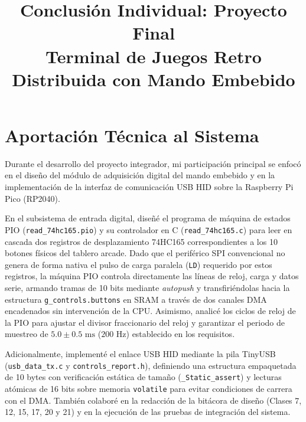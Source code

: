 \documentclass[conference]{IEEEtran}
\begin{document}
\title{Conclusión Individual: Proyecto Final \\
\large Terminal de Juegos Retro Distribuida con Mando Embebido}

\author{
}

\maketitle

\section*{Aportación Técnica al Sistema}

Durante el desarrollo del proyecto integrador, mi participación principal se enfocó en el diseño del módulo de adquisición digital del mando embebido y en la implementación de la interfaz de comunicación USB HID sobre la Raspberry Pi Pico (RP2040).

En el subsistema de entrada digital, diseñé el programa de máquina de estados PIO (\texttt{read\_74hc165.pio}) y su controlador en C (\texttt{read\_74hc165.c}) para leer en cascada dos registros de desplazamiento 74HC165 correspondientes a los 10 botones físicos del tablero arcade. Dado que el periférico SPI convencional no genera de forma nativa el pulso de carga paralela (\texttt{LD}) requerido por estos registros, la máquina PIO controla directamente las líneas de reloj, carga y datos serie, armando tramas de 10 bits mediante \textit{autopush} y transfiriéndolas hacia la estructura \texttt{g\_controls.buttons} en SRAM a través de dos canales DMA encadenados sin intervención de la CPU. Asimismo, analicé los ciclos de reloj de la PIO para ajustar el divisor fraccionario del reloj y garantizar el periodo de muestreo de $5.0 \pm 0.5\text{ ms}$ ($200\text{ Hz}$) establecido en los requisitos.

Adicionalmente, implementé el enlace USB HID mediante la pila TinyUSB (\texttt{usb\_data\_tx.c} y \texttt{controls\_report.h}), definiendo una estructura empaquetada de 10 bytes con verificación estática de tamaño (\texttt{\_Static\_assert}) y lecturas atómicas de 16 bits sobre memoria \texttt{volatile} para evitar condiciones de carrera con el DMA. También colaboré en la redacción de la bitácora de diseño (Clases 7, 12, 15, 17, 20 y 21) y en la ejecución de las pruebas de integración del sistema.
\end{document}
